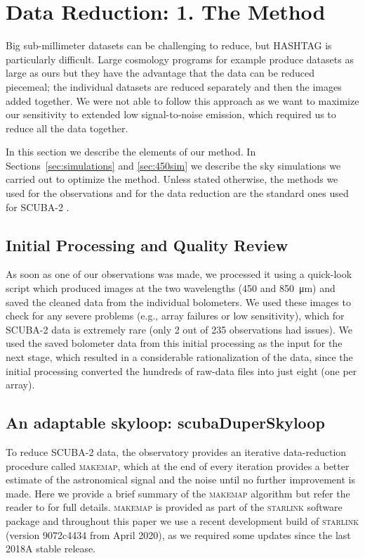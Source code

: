 \documentclass[a4paper,fleqn,usenatbib, twocolumn]{aastex63}
\begin{document}

\section{Data Reduction: 1. The Method}
\label{sec:dataReduc}

Big sub-millimeter datasets can be challenging to reduce, but HASHTAG is particularly difficult. Large cosmology programs for example 
produce datasets as large as ours but they have the advantage that the data can be reduced piecemeal; the individual datasets are reduced separately and then
the images added together. We were not able to
follow this approach as we want to maximize our sensitivity to extended low signal-to-noise  
emission, which required us to reduce all the data together.

In this section we describe the elements of our method. In Sections~\ref{sec:simulations} and \ref{sec:450sim} we describe the sky simulations we carried out to optimize the method. Unless stated otherwise, the methods we used for the observations and for the data reduction are
the standard ones used for SCUBA-2 \citep{Dempsey2013,Chapin2013}.

\subsection{Initial Processing and Quality Review}
\label{sec:initialProcessing}

As soon as one of our observations was made, we processed it using a quick-look script which produced images at 
the two wavelengths (450 and \SI{850}{\micro\meter}) and saved
the cleaned data from the individual bolometers. We used these images to check for
any severe problems (e.g., array failures or low sensitivity), which for SCUBA-2 data is extremely rare (only 2 out of 235 observations had issues). 
We used the saved bolometer data from this initial processing as the input for the next stage, which resulted in a considerable rationalization of the data, since the initial processing converted the hundreds of raw-data files into just eight (one per array). 

\subsection{An adaptable skyloop: scubaDuperSkyloop}
\label{sec:pipeline}

To reduce SCUBA-2 data, the observatory provides an iterative data-reduction procedure called  
\textsc{makemap}, which at the end of every iteration provides a better estimate of the astronomical signal and the noise until no further improvement is made. Here we provide a brief summary of 
the \textsc{makemap} algorithm but refer the reader to \citet{Chapin2013} for full details. \textsc{makemap} is provided as part of the \textsc{starlink} software package \citep{Currie2014} and throughout this paper we use a recent development build of \textsc{starlink} (version 9072c4434 from April 2020), 
as we required some updates since the last 2018A stable release. 
\end{document}
